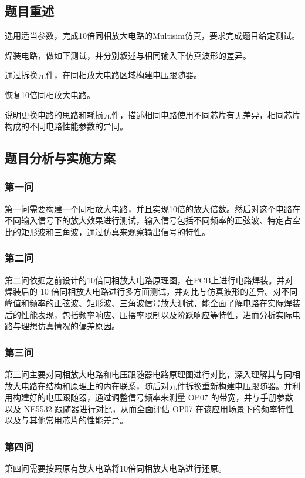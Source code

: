 \documentclass[./测控三级项目.tex]{subfiles} %
\begin{document}
	\subsection{题目重述}
		\begin{compactenum}
			\item 选用适当参数，完成10倍同相放大电路的Multisim仿真，要求完成题目给定测试。
			\item 焊装电路，做如下测试，并分别叙述与相同输入下仿真波形的差异。
			\item 通过拆换元件，在同相放大电路区域构建电压跟随器。
			\item 恢复10倍同相放大电路。
			\item 说明更换电路的思路和耗损元件，描述相同电路使用不同芯片有无差异，相同芯片构成的不同电路性能参数的异同。
		\end{compactenum}
	\subsection{题目分析与实施方案}
		\subsubsection{第一问}
			第一问需要构建一个同相放大电路，并且实现10倍的放大倍数。然后对这个电路在不同输入信号下的放大效果进行测试，输入信号包括不同频率的正弦波、特定占空比的矩形波和三角波，通过仿真来观察输出信号的特性。
		\subsubsection{第二问}
			第二问依据之前设计的10倍同相放大电路原理图，在PCB上进行电路焊装。并对焊装后的 10 倍同相放大电路进行多方面测试，并对比与仿真波形的差异。对不同峰值和频率的正弦波、矩形波、三角波信号放大测试，能全面了解电路在实际焊装后的性能表现，包括频率响应、压摆率限制以及阶跃响应等特性，进而分析实际电路与理想仿真情况的偏差原因。
		\subsubsection{第三问}
			第三问主要对同相放大电路和电压跟随器电路原理图进行对比，深入理解其与同相放大电路在结构和原理上的内在联系，随后对元件拆换重新构建电压跟随器。并利用构建好的电压跟随器，通过调整信号频率来测量 OP07 的带宽，并与手册参数以及 NE5532 跟随器进行对比，从而全面评估 OP07 在该应用场景下的频率特性以及与其他常用芯片的性能差异。
		\subsubsection{第四问}
			第四问需要按照原有放大电路将10倍同相放大电路进行还原。
\end{document}

